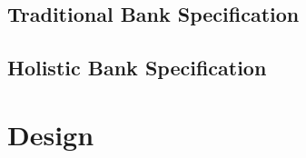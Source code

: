 \documentclass[acmsmall,review,anonymous]{acmart}\settopmatter{printfolios=true,printccs=false,printacmref=false}
\begin{document}
\subsection{Traditional Bank Specification}

\subsection{Holistic Bank Specification}

\section{Design}

\subsection{\Loo}
\end{document}
